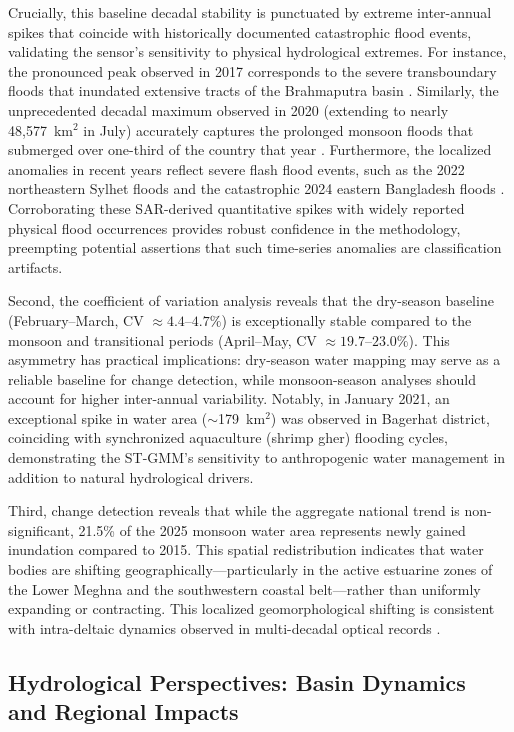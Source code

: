 \documentclass[fleqn,10pt,twocolumn]{article}
\begin{document}
Crucially, this baseline decadal stability is punctuated by extreme inter-annual spikes that coincide with historically documented catastrophic flood events, validating the sensor's sensitivity to physical hydrological extremes. For instance, the pronounced peak observed in 2017 corresponds to the severe transboundary floods that inundated extensive tracts of the Brahmaputra basin \cite{khandker2021}. Similarly, the unprecedented decadal maximum observed in 2020 (extending to nearly 48,577~km$^2$ in July) accurately captures the prolonged monsoon floods that submerged over one-third of the country that year \cite{rahman2021, islam2022}. Furthermore, the localized anomalies in recent years reflect severe flash flood events, such as the 2022 northeastern Sylhet floods and the catastrophic 2024 eastern {Bangladesh} floods \cite{needsm2024}. Corroborating these SAR-derived quantitative spikes with widely reported physical flood occurrences provides robust confidence in the methodology, preempting potential assertions that such time-series anomalies are classification artifacts.

Second, the coefficient of variation analysis reveals that the dry-season baseline (February--March, CV $\approx 4.4$--$4.7\%$) is exceptionally stable compared to the monsoon and transitional periods (April--May, CV $\approx 19.7$--$23.0\%$). This asymmetry has practical implications: dry-season water mapping may serve as a reliable baseline for change detection, while monsoon-season analyses should account for higher inter-annual variability. Notably, in January 2021, an exceptional spike in water area ($\sim$179~km$^2$) was observed in Bagerhat district, coinciding with synchronized aquaculture (shrimp gher) flooding cycles, demonstrating the ST-GMM's sensitivity to anthropogenic water management in addition to natural hydrological drivers.

Third, change detection reveals that while the aggregate national trend is non-significant, 21.5\% of the 2025 monsoon water area represents newly gained inundation compared to 2015. This spatial redistribution indicates that water bodies are shifting geographically—particularly in the active estuarine zones of the Lower Meghna and the southwestern coastal belt—rather than uniformly expanding or contracting. This localized geomorphological shifting is consistent with intra-deltaic dynamics observed in multi-decadal optical records \cite{pekel2016}.

\subsection{Hydrological Perspectives: Basin Dynamics and Regional Impacts}
\end{document}
